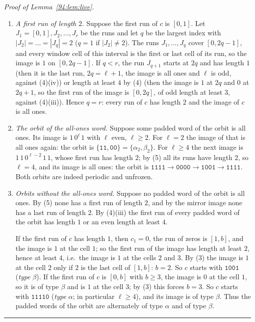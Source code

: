\documentclass[10pt,a4paper]{article}
\newcommand{\qedmark}{\rule{1.1ex}{1.1ex}}
\newenvironment{proof}[1][Proof]{\par\smallskip\noindent\textit{#1.}\ }{\hfill\qedmark\par\smallskip}
\newcommand{\code}[1]{\mathtt{#1}}            %
\begin{document}
\begin{proof}[Proof of Lemma~\ref{94:lem:live}]
\begin{enumerate}[label=(\arabic*),leftmargin=*,nosep]
$b-1$ is even. The same holds for the last run. (iv) If $c$ is all ones, the image has a run of zeros of length
$\ell$, so $\ell$ is even ($\ell=1$ gives $\code{101}$).
\item \emph{A first run of length $2$.} Suppose the first run of $c$ is $[0,1]$. Let $J_1=[0,1],J_2,\dots,J_r$ be
the runs and let $q$ be the largest index with $|J_2|=\dots=|J_q|=2$ ($q=1$ if $|J_2|\ne2$). The runs
$J_1,\dots,J_q$ cover $[0,2q-1]$, and every window cell of this interval is the first or last cell of its run, so
the image is $1$ on $[0,2q-1]$. If $q<r$, the run $J_{q+1}$ starts at $2q$ and has length $1$ (then it is the last
run, $2q=\ell+1$, the image is all ones and $\ell$ is odd, against (4)(iv)) or length at least $4$ by (4) (then
the image is $1$ at $2q$ and $0$ at $2q+1$, so the first run of the image is $[0,2q]$, of odd length at least
$3$, against (4)(iii)). Hence $q=r$: every run of $c$ has length $2$ and the image of $c$ is all ones.
\item \emph{The orbit of the all-ones word.} Suppose some padded word of the orbit is all ones. Its image is
$1\,0^\ell\,1$ with $\ell$ even, $\ell\ge2$. For $\ell=2$ the image of that is all ones again: the orbit is
$\{\code{11},\code{00}\}=\{\alpha_2,\beta_2\}$. For $\ell\ge4$ the next image is $1\,1\,0^{\ell-2}\,1\,1$, whose
first run has length $2$; by (5) all its runs have length $2$, so $\ell=4$, and its image is all ones: the orbit
is $\code{1111}\to\code{0000}\to\code{1001}\to\code{1111}$. Both orbits are indeed periodic and unfrozen.
\item \emph{Orbits without the all-ones word.} Suppose no padded word of the orbit is all ones. By (5) none has a
first run of length $2$, and by the mirror image none has a last run of length $2$. By (4)(iii) the first run of
every padded word of the orbit has length $1$ or an even length at least $4$.

If the first run of $c$ has length $1$, then $c_1=0$, the run of zeros is $[1,b]$, and the image is $1$ at the
cell $1$; so the first run of the image has length at least $2$, hence at least $4$, i.e.\ the image is $1$ at the
cells $2$ and $3$. By (3) the image is $1$ at the cell $2$ only if $2$ is the last cell of $[1,b]$: $b=2$. So $c$
starts with $\code{1001}$ (\emph{type} $\beta$).
If the first run of $c$ is $[0,b]$ with $b\ge3$, the image is $0$ at the cell $1$, so it is of type $\beta$ and is
$1$ at the cell $3$; by (3) this forces $b=3$. So $c$ starts with $\code{11110}$ (\emph{type} $\alpha$; in
particular $\ell\ge4$), and its image is of type $\beta$. Thus the padded words of the orbit are alternately of
type $\alpha$ and of type $\beta$.


\end{enumerate}
\end{proof}
\end{document}
